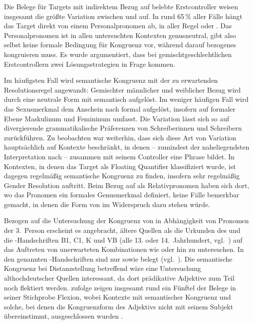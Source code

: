 Die Belege für Targets mit indirektem Bezug auf belebte Erstcontroller weisen
insgesamt die größte Variation zwischen  und  auf. In
rund 65\,\% aller Fälle hängt das Target direkt von einem Personalpronomen ab,
in aller Regel  oder . Das Personalpronomen ist in allen
untersuchten Kontexten genusneutral, gibt also selbst keine formale Bedingung
für Kongruenz vor, während darauf bezogenes  kongruieren muss. Es
wurde argumentiert, dass bei gemischtgeschlechtlichen Erstcontrollern zwei
Lösungsstrategien in Frage kommen.

Im häufigsten Fall wird semantische Kongruenz mit der zu erwartenden
Resolutionsregel angewandt: Gemischter männlicher und weiblicher Bezug wird
durch eine neutrale Form mit \mbox{} semantisch aufgelöst. Im weniger
häufigen Fall wird das Sexusmerkmal dem Anschein nach formal aufgelöst,
insofern  auf formaler Ebene Maskulinum und Femininum umfasst. Die
Variation lässt sich so auf divergierende grammatikalische Präferenzen von
Schreiberinnen und Schreibern zurück\-führen. Zu beobachten war weiterhin, dass
sich diese Art von Variation hauptsächlich auf Kontexte beschränkt, in denen
 -- zumindest der naheliegendsten Interpretation nach -- zusammen
mit seinem Controller eine Phrase bildet. In Kontexten, in denen das Target als
Floating Quantifier klassifiziert wurde, ist dagegen regelmäßig semantische
Kongruenz zu finden, insofern sehr regelmäßig Gender Resolution auftritt. Beim
Bezug auf  als Relativpronomen haben sich dort, wo das Pronomen
ein formales Genusmerkmal definiert, keine Fälle bemerkbar gemacht, in denen
die Form von  im Widerspruch dazu stehen würde.

Bezogen auf die Untersuchung der Kongruenz von  in Abhängigkeit von
Pro\-nomen der 3.~Person erscheint es angebracht, ältere Quellen als die
Urkunden des \CAO{} und die \KC{}-Handschriften B1, C1, K und VB (alle 13. oder
14.~Jahrhundert, vgl.~) auf das Auftreten von unerwarteten
Kombinationen wie  oder  hin zu untersuchen.
In den genannten \KC{}-Handschriften sind nur  sowie
 belegt (vgl.~). Die
semantische Kongruenz bei Distanz\-stellung betreffend wäre eine Untersuchung
althochdeutscher Quellen interessant, da dort prädikative
Adjektive zum Teil noch flektiert werden. \citet[310--311]{fleischer2007}
zufolge zeigen insgesamt rund ein Fünftel der Belege in seiner Stichprobe
Flexion, wobei Kontexte mit semantischer Kongruenz und solche, bei denen die
Kongruenzform des Adjektivs nicht mit seinem Subjekt übereinstimmt,
ausgeschlossen wurden \autocite[304]{fleischer2007}.

